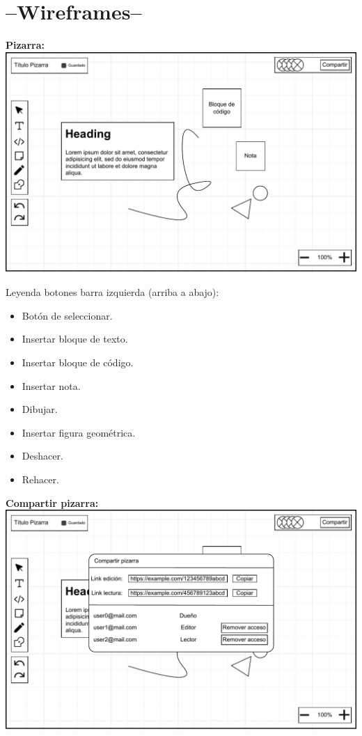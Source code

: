 \documentclass[a4paper, oneside, final]{scrartcl}
\begin{document}
  
\section{--Wireframes--}
\textbf{\large Pizarra:}\\[3mm]
\includegraphics[width=\textwidth]{images/WireframePizarra.drawio.pdf}

Leyenda botones barra izquierda (arriba a abajo):
\begin{itemize}
    \item Botón de seleccionar.
    \item Insertar bloque de texto.
    \item Insertar bloque de código.
    \item Insertar nota.
    \item Dibujar.
    \item Insertar figura geométrica.
    \item Deshacer.
    \item Rehacer.
\end{itemize}

\textbf{\large Compartir pizarra:}\\[3mm]
\includegraphics[width=\textwidth]{images/WireframePizarra-Ventana-compartir-pizarra.drawio.pdf}
\end{document}
